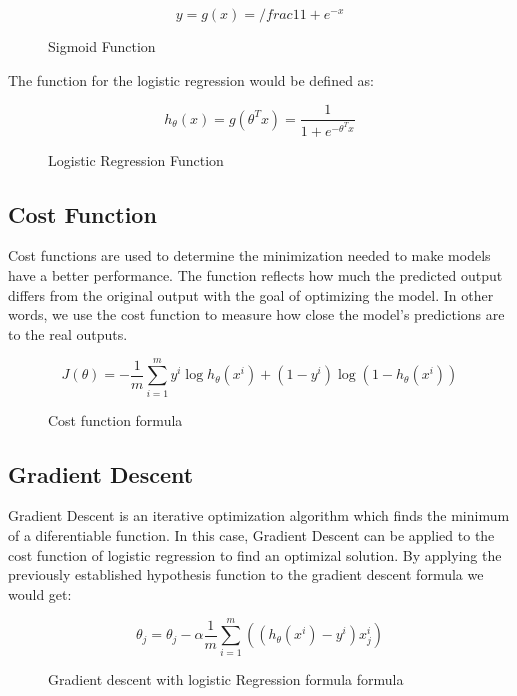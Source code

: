 \documentclass[letterpaper, 10 pt, conference]{ieeeconf}
\begin{document}
\begin{figure}[thpb]
    \centering
    \begin{equation}
        y = g(x) = /frac{1}{1 + e^{-x}}
    \end{equation}
    \caption{Sigmoid Function}
    \label{sigmoid_formula}
 \end{figure}

 The function for the logistic regression would be defined as:
 \begin{figure}[thpb]
    \centering
    \begin{equation}
        h_\theta (x) = g(\theta^Tx) = \frac{1}{1 + e^{-\theta^Tx} }
    \end{equation}
    \caption{Logistic Regression Function}
    \label{logistic_formula}
 \end{figure}

\subsection{Cost Function}
Cost functions are used to determine the minimization needed to make models have a better performance. The function reflects how much
the predicted output differs from the original output with the goal of optimizing the model. In other words, we use the cost function to measure how
close the model's predictions are to the real outputs.

\begin{figure}[thpb]
    \centering
    \begin{equation}
        J(\theta) = - \frac{1}{m}\sum_{i = 1}^{m} y^i \log h_\theta(x^i) + (1-y^i)\log(1 - h_\theta(x^i))
    \end{equation}
    \caption{Cost function formula}
    \label{cost_formula}
 \end{figure}

\subsection{Gradient Descent}
Gradient Descent is an iterative optimization algorithm which finds the minimum of a diferentiable function. In this case, Gradient Descent
can be applied to the cost function of logistic regression to find an optimizal solution. By applying the previously established
hypothesis function to the gradient descent formula we would get:


\begin{figure}[thpb]
    \centering
    \begin{equation}
        \theta_j = \theta_j - \alpha\frac{1}{m}\sum_{i = 1}^{m}((h_\theta(x^i) - y^i)x^i_j)
    \end{equation}
    \caption{Gradient descent with logistic Regression formula formula}
    \label{gd_formula}
 \end{figure}
\end{document}
